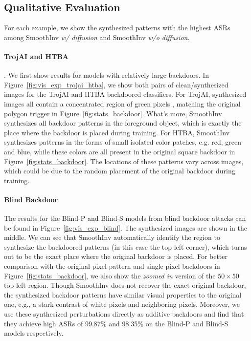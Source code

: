 \documentclass[10pt,twocolumn,letterpaper]{article}
\begin{document}
\subsection{Qualitative Evaluation}
For each example, we show the synthesized patterns with the highest ASRs among SmoothInv \textit{w/ diffusion} and SmoothInv \textit{w/o diffusion}.

\paragraph{TrojAI and HTBA}.
We first show results for models with relatively large backdoors. In Figure~\ref{fig:vis_exp_trojai_htba}, we show both pairs of clean/synthesized images for the TrojAI and HTBA backdoored classifiers. For TrojAI, synthesized images all contain a concentrated region of green pixels , matching  the original polygon trigger in Figure~\ref{fig:stats_backdoor}. What's more, SmoothInv synthesizes all backdoor patterns in the foreground object, which is exactly the place where the backdoor is placed during training. For HTBA, SmoothInv synthesizes patterns in the forms of small isolated color patches, e.g. red, green and blue, while these colors are all present in the original square backdoor in Figure~\ref{fig:stats_backdoor}. The locations of these patterns vary across images, which could be due to the random placement of the original backdoor during training.

\paragraph{Blind Backdoor} 
The results for the Blind-P and Blind-S models from blind backdoor attacks can be found in Figure~\ref{fig:vis_exp_blind}. The synthesized images are shown in the middle. We can see that SmoothInv  automatically identify the region to synthesize the backdoored patterns (in this case the top left corner), which turns out to be the exact place where the original backdoor is placed. For better comparison with the original pixel pattern and single pixel backdoors in Figure~\ref{fig:stats_backdoor}, we also show the \textit{zoomed in} version of the $50\times 50$ top left region. Though SmoothInv does not recover the exact original backdoor, the synthesized backdoor patterns have similar visual properties to the original one, e.g., a stark contrast of white pixels and neighboring pixels. Moreover, we use these synthesized perturbations directly as additive backdoors and find that they achieve high ASRs of 99.87$\%$ and 98.35$\%$ on the Blind-P and Blind-S models respectively. 
\end{document}
